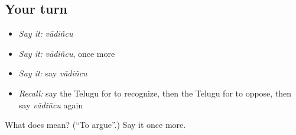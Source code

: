 \subsection*{Your turn}
\begin{itemize}
\raggedright
  \item \emph{Say it:} \emph{vādiñcu}
  \item \emph{Say it:} \emph{vādiñcu}, once more
  \item \emph{Say it:} say \emph{vādiñcu}
  \item \emph{Recall:} say the Telugu for to recognize, then the Telugu for to oppose, then say \emph{vādiñcu} again
\end{itemize}

\begin{tcolorbox}[breakable,colback=teal!4,colframe=teal!35!black,title={Before you move on}]
What does  mean? (\textquotedblleft{}To argue\textquotedblright{}.) Say it once more.
\end{tcolorbox}
